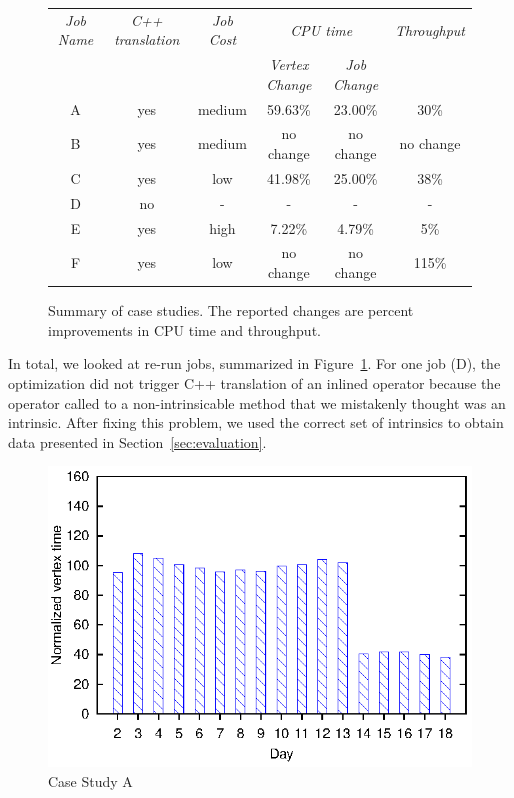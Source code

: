 \begin{figure}[ht]
\begin{tabular}{c|c|c|c|c|c} 
\toprule
  {\em Job Name} & {\em C++ translation}&{\em Job Cost} & \multicolumn{2}{c}{\em CPU time} &  {\em Throughput } \\
  \cmidrule{4-5}  
  & & & {\em Vertex Change} & {\em Job Change} &  \\
  \midrule

A & yes & medium & 59.63\%  & 23.00\% & 30\% \\
B &yes & medium & no change & no change & no change\\
C & yes & low    & 41.98\%  & 25.00\% & 38\% \\
D & no & - & - & - & -\\
E & yes & high   & 7.22\%   & 4.79\% &  5\% \\
F & yes & low & no change & no change & 115\% \\

\end{tabular}
\caption{Summary of case studies. The reported changes are percent improvements in CPU time and throughput. \label{fig:caseStudySummary}}
\end{figure}

In total, we looked at \casestudyjobs{} re-run jobs, summarized in Figure~\ref{fig:caseStudySummary}. 
For one job (D), the optimization did not trigger C++ translation of an inlined operator because the operator called to a non-intrinsicable method that we mistakenly thought was an intrinsic.
After fixing this problem, we used the correct set of intrinsics to obtain data presented in Section~\ref{sec:evaluation}.
\begin{figure}[ht]
\includegraphics{graphs/normalizedTimesA}
\caption{Case Study A \label{fig:CaseStudyA}}
\end{figure}

